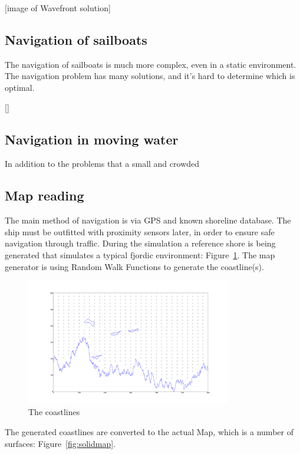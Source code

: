 [image of Wavefront solution]

\subsection{Navigation of sailboats}

The navigation of sailboats is much more complex, even in a static environment. The navigation problem has many solutions, and it's hard to determine which is optimal.

[]

\subsection{Navigation in moving water}

In addition to the problems that a small and crowded

\subsection{Map reading}

The main method of navigation is via GPS and known shoreline database. The ship must be outfitted with proximity sensors later, in order to ensure safe navigation through traffic. During the simulation a reference shore is being generated that simulates a typical fjordic environment: Figure~\ref{fig:linemap}. The map generator is using Random Walk Functions to generate the coastline(s).

\begin{figure}[H]
	\centering
	\includegraphics[width=0.8\textwidth]{img/linemap}
	\caption{The coastlines}
	\label{fig:linemap}
\end{figure}

The generated coastlines are converted to the actual Map, which is a number of surfaces: Figure~\ref{fig:solidmap}.


